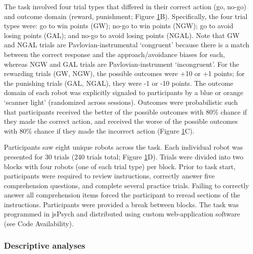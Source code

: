 \documentclass[a4paper,12pt]{article}
\begin{document}
\begin{refsection}[main]
The task involved four trial types that differed in their correct action (go, no-go) and outcome domain (reward, punishment; Figure \ref{fig:task_schematic}B). Specifically, the four trial types were: go to win points (GW); no-go to win points (NGW); go to avoid losing points (GAL); and no-go to avoid losing points (NGAL). Note that GW and NGAL trials are Pavlovian-instrumental `congruent' because there is a match between the correct response and the approach/avoidance biases for each, whereas NGW and GAL trials are Pavlovian-instrument `incongruent'. For the rewarding trials (GW, NGW), the possible outcomes were +10 or +1 points; for the punishing trials (GAL, NGAL), they were -1 or -10 points. The outcome domain of each robot was explicitly signaled to participants by a blue or orange `scanner light' (randomized across sessions). Outcomes were probabilistic such that participants received the better of the possible outcomes with 80\% chance if they made the correct action, and received the worse of the possible outcomes with 80\% chance if they made the incorrect action (Figure \ref{fig:task_schematic}C).

Participants saw eight unique robots across the task. Each individual robot was presented for 30 trials (240 trials total; Figure \ref{fig:task_schematic}D). Trials were divided into two blocks with four robots (one of each trial type) per block. Prior to task start, participants were required to review instructions, correctly answer five comprehension questions, and complete several practice trials. Failing to correctly answer all comprehension items forced the participant to reread sections of the instructions. Participants were provided a break between blocks. The task was programmed in jsPsych \cite{de2015jspsych} and distributed using custom web-application software (see Code Availability). 

\begin{figure}[t]
    \centerline{}
    \caption{}
    \label{fig:task_schematic}
\end{figure}

\subsubsection*{Descriptive analyses}


\end{refsection}
\end{document}
